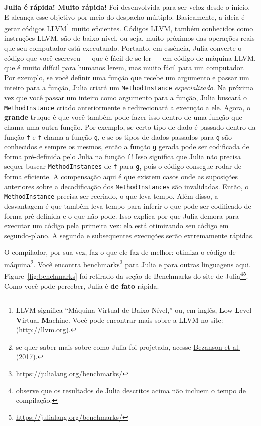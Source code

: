 \documentclass[
  notoc %
]{tufte-book}
\DeclareRobustCommand{\href}[2]{#2\footnote{\url{#1}}}
\newcommand{\passthrough}[1]{#1}
\begin{document}
\textbf{Julia é rápida! Muito rápida!} Foi desenvolvida para ser veloz
desde o início. E alcança esse objetivo por meio do despacho múltiplo.
Basicamente, a ideia é gerar códigos LLVM\footnote{LLVM significa
  ``Máquina Virtual de Baixo-Nível,'' ou, em inglês, \textbf{L}ow
  \textbf{L}evel \textbf{V}irtual \textbf{M}achine. Você pode encontrar
  mais sobre a LLVM no site: (\url{http://llvm.org}).} muito eficientes.
Códigos LLVM, também conhecidos como instruções LLVM, são de
baixo-nível, ou seja, muito próximos das operações reais que seu
computador está executando. Portanto, em essência, Julia converte o
código que você escreveu --- que é fácil de se ler --- em código de
máquina LLVM, que é muito difícil para humanos lerem, mas muito fácil
para um computador. Por exemplo, se você definir uma função que recebe
um argumento e passar um inteiro para a função, Julia criará um
\passthrough{\lstinline!MethodInstance!} \emph{especializado}. Na
próxima vez que você passar um inteiro como argumento para a função,
Julia buscará o \passthrough{\lstinline!MethodInstance!} criado
anteriormente e redirecionará a execução a ele. Agora, o \textbf{grande}
truque é que você também pode fazer isso dentro de uma função que chama
uma outra função. Por exemplo, se certo tipo de dado é passado dentro da
função \passthrough{\lstinline!f!} e \passthrough{\lstinline!f!} chama a
função \passthrough{\lstinline!g!}, e se os tipos de dados passados para
\passthrough{\lstinline!g!} são conhecidos e sempre os mesmos, então a
função \passthrough{\lstinline!g!} gerada pode ser codificada de forma
pré-definida pelo Julia na função \passthrough{\lstinline!f!}! Isso
significa que Julia não precisa sequer buscar
\passthrough{\lstinline!MethodInstances!} de \passthrough{\lstinline!f!}
para \passthrough{\lstinline!g!}, pois o código consegue rodar de forma
eficiente. A compensação aqui é que existem casos onde as suposições
anteriores sobre a decodificação dos
\passthrough{\lstinline!MethodInstances!} são invalidadas. Então, o
\passthrough{\lstinline!MethodInstance!} precisa ser recriado, o que
leva tempo. Além disso, a desvantagem é que também leva tempo para
inferir o que pode ser codificado de forma pré-definida e o que não
pode. Isso explica por que Julia demora para executar um código pela
primeira vez: ela está otimizando seu código em segundo-plano. A segunda
e subsequentes execuções serão extremamente rápidas.

O compilador, por sua vez, faz o que ele faz de melhor: otimiza o código
de máquina\footnote{se quer saber mais sobre como Julia foi projetada,
  acesse \protect\hyperlink{ref-bezanson2017julia}{Bezanson et al.}
  (\protect\hyperlink{ref-bezanson2017julia}{2017}).}. Você encontra
\href{https://julialang.org/benchmarks/}{benchmarks} para Julia e para
outras linguagens aqui. Figure~\ref{fig:benchmarks} foi retirado da
\href{https://julialang.org/benchmarks/}{seção de Benchmarks do site de
Julia\footnote{observe que os resultados de Julia descritos acima não
  incluem o tempo de compilação.}}. Como você pode perceber, Julia é
\textbf{de fato} rápida.
\end{document}
